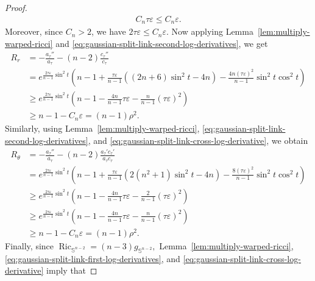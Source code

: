 \documentclass[11pt,reqno]{amsart}
\numberwithin{equation}{section}
\theoremstyle{definition}
\theoremstyle{remark}
\newcommand{\ta}{\tau}
\newcommand{\0}{\emptyset}
\newcommand{\veps}{\varepsilon}
\newcommand{\bbS}{\mathbb S}
\newcommand{\Ric}{\operatorname{Ric}}
\begin{document}
\begin{proof}
\begin{align}
        C_n\ta\veps
        \leq
        C_n\veps.
\end{align}
Moreover, since $C_n>2$, we have $ 2\ta\veps \leq C_n\veps.$  Now applying Lemma~\ref{lem:multiply-warped-ricci} and
\eqref{eq:gaussian-split-link-second-log-derivatives}, we get
\begin{align}
        R_r
        &=
        -\frac{a_\ta''}{a_\ta}
        -(n-2)\frac{c_\ta''}{c_\ta}\\
        &=
        e^{\frac{2\ta\veps}{n-1}\sin^2t}
        \left(
        n-1
        +
        \frac{\ta\veps}{n-1}
        \left(
        (2n+6)\sin^2t-4n
        \right)
        -
        \frac{4n(\ta\veps)^2}{n-1}
        \sin^2t\cos^2t
        \right)\\
        &\geq
        e^{\frac{2\ta\veps}{n-1}\sin^2t}
        \left(
        n-1
        -
        \frac{4n}{n-1}\ta\veps
        -
        \frac{n}{n-1}(\ta\veps)^2
        \right)\\
        &\geq
        n-1-C_n\veps = (n-1)\rho^2.
        \label{eq:gaussian-split-link-Rr}
\end{align}
Similarly, using Lemma~\ref{lem:multiply-warped-ricci},
\eqref{eq:gaussian-split-link-second-log-derivatives}, and
\eqref{eq:gaussian-split-link-cross-log-derivative}, we obtain
\begin{align}
        R_\theta
        &=
        -\frac{a_\ta''}{a_\ta}
        -(n-2)\frac{a_\ta'c_\ta'}{a_\ta c_\ta}\\
        &=
        e^{\frac{2\ta\veps}{n-1}\sin^2t}
        \left(
        n-1
        +
        \frac{\ta\veps}{n-1}
        \left(
        2(n^2+1)\sin^2t-4n
        \right)
        -
        \frac{8(\ta\veps)^2}{n-1}
        \sin^2t\cos^2t
        \right)\\
        &\geq
        e^{\frac{2\ta\veps}{n-1}\sin^2t}
        \left(
        n-1
        -
        \frac{4n}{n-1}\ta\veps
        -
        \frac{2}{n-1}(\ta\veps)^2
        \right)\\
        &\geq
        e^{\frac{2\ta\veps}{n-1}\sin^2t}
        \left(
        n-1
        -
        \frac{4n}{n-1}\ta\veps
        -
        \frac{n}{n-1}(\ta\veps)^2
        \right)\\
        &\geq
        n-1-C_n\veps=
        (n-1)\rho^2.
        \label{eq:gaussian-split-link-Rtheta}
\end{align}
Finally, since $\Ric_{\bbS^{n-2}}= (n-3)g_{\bbS^{n-2}},$ Lemma~\ref{lem:multiply-warped-ricci},
\eqref{eq:gaussian-split-link-first-log-derivatives}, and
\eqref{eq:gaussian-split-link-cross-log-derivative} imply that

\end{proof}
\end{document}
